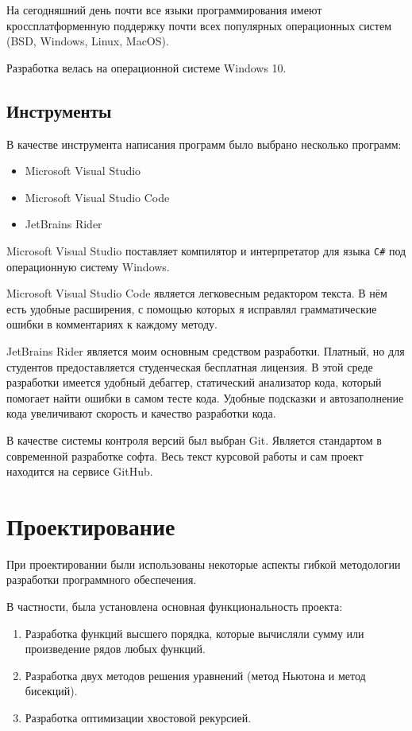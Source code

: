 На сегодняшний день почти все языки программирования имеют кроссплатформенную поддержку почти всех популярных операционных систем (BSD, Windows, Linux, MacOS).

Разработка велась на операционной системе Windows 10.

\subsection{Инструменты}

В качестве инструмента написания программ было выбрано несколько программ:

\begin{itemize}
	\item Microsoft Visual Studio
	\item Microsoft Visual Studio Code
	\item JetBrains Rider
\end{itemize}

Microsoft Visual Studio поставляет компилятор и интерпретатор для языка \texttt{C\#} под операционную систему Windows.

Microsoft Visual Studio Code является легковесным редактором текста.
В нём есть удобные расширения, с помощью которых я исправлял грамматические ошибки в комментариях к каждому методу.

JetBrains Rider является моим основным средством разработки.
Платный, но для студентов предоставляется студенческая бесплатная лицензия.
В этой среде разработки имеется удобный дебаггер, статический анализатор кода, который помогает найти ошибки в самом тесте кода.
Удобные подсказки и автозаполнение кода увеличивают скорость и качество разработки кода.

В качестве системы контроля версий был выбран Git.
Является стандартом в современной разработке софта.
Весь текст курсовой работы и сам проект находится на сервисе GitHub\cite{GitHub}.

\newpage
\section{Проектирование}

При проектировании были использованы некоторые аспекты гибкой методологии разработки программного обеспечения.

В частности, была установлена основная функциональность проекта:

\begin{enumerate}
	\item Разработка функций высшего порядка, которые вычисляли сумму или произведение рядов любых функций.
	\item Разработка двух методов решения уравнений (метод Ньютона и метод бисекций).
	\item Разработка оптимизации хвостовой рекурсией.
\end{enumerate}

